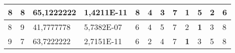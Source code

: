 \documentclass[conference]{IEEEtran}
\begin{document}
\begin{table*}[]
\begin{tabular}{|llll|llllllll|}
\multicolumn{1}{|l|}{8}                                                     & \multicolumn{1}{l|}{8}                                                        & \multicolumn{1}{l|}{65,1222222}                                                   & 1,4211E-11                     & \multicolumn{1}{l|}{8}                                                  & \multicolumn{1}{l|}{4}                                                  & \multicolumn{1}{l|}{3}                                                  & \multicolumn{1}{l|}{7}                                                  & \multicolumn{1}{l|}{\textbf{1}}                                         & \multicolumn{1}{l|}{5}                                                  & \multicolumn{1}{l|}{2}                                                  & 6                          \\ \hline
\multicolumn{1}{|l|}{8}                                                     & \multicolumn{1}{l|}{9}                                                        & \multicolumn{1}{l|}{41,7777778}                                                   & 5,7382E-07                     & \multicolumn{1}{l|}{6}                                                  & \multicolumn{1}{l|}{4}                                                  & \multicolumn{1}{l|}{5}                                                  & \multicolumn{1}{l|}{7}                                                  & \multicolumn{1}{l|}{2}                                                  & \multicolumn{1}{l|}{\textbf{1}}                                         & \multicolumn{1}{l|}{3}                                                  & 8                          \\ \hline
\multicolumn{1}{|l|}{9}                                                     & \multicolumn{1}{l|}{7}                                                        & \multicolumn{1}{l|}{63,7222222}                                                   & 2,7151E-11                     & \multicolumn{1}{l|}{6}                                                  & \multicolumn{1}{l|}{2}                                                  & \multicolumn{1}{l|}{4}                                                  & \multicolumn{1}{l|}{7}                                                  & \multicolumn{1}{l|}{\textbf{1}}                                         & \multicolumn{1}{l|}{3}                                                  & \multicolumn{1}{l|}{5}                                                  & 8                          \\ \hline

\end{tabular}
\end{table*}
\end{document}
